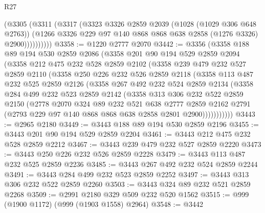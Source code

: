 \begin{lexlean}{R27}
\begin{coremodule}
              (@3305
                (@3311
                  (@3317
                    (@3323
                      @3326
                      @2859
                      @2039
                      (@1028 (@1029 @306 @648 @2763))
                      (@1266 @3326 @229 @97 @140 @868 @868 @638 @2858 (@1276 @3326) @2900))))))))))
@3358 := @1220 @2777 @2070
@3442 := @3356
    (@3358
      @188
      @89
      @194
      @530
      @2859
      @2086
      (@3358
        @201
        @90
        @194
        @529
        @2859
        @2094
        (@3358
          @212
          @475
          @232
          @528
          @2859
          @2102
          (@3358
            @239
            @479
            @232
            @527
            @2859
            @2110
            (@3358
              @250
              @226
              @232
              @526
              @2859
              @2118
              (@3358
                @113
                @487
                @232
                @525
                @2859
                @2126
                (@3358
                  @267
                  @492
                  @232
                  @524
                  @2859
                  @2134
                  (@3358
                    @284
                    @499
                    @232
                    @523
                    @2859
                    @2142
                    (@3358
                      @313
                      @306
                      @232
                      @522
                      @2859
                      @2150
                      (@2778
                        @2070
                        @324
                        @89
                        @232
                        @521
                        @638
                        @2777
                        @2859
                        @2162
                        @2791
                        (@2793 @229 @97 @140 @868 @868 @638 @2858 @2801 @2900)))))))))))
@3443 := @2965 @2180
@3449 := @3443 @188 @89 @194 @530 @2859 @2196
@3455 := @3443 @201 @90 @194 @529 @2859 @2204
@3461 := @3443 @212 @475 @232 @528 @2859 @2212
@3467 := @3443 @239 @479 @232 @527 @2859 @2220
@3473 := @3443 @250 @226 @232 @526 @2859 @2228
@3479 := @3443 @113 @487 @232 @525 @2859 @2236
@3485 := @3443 @267 @492 @232 @524 @2859 @2244
@3491 := @3443 @284 @499 @232 @523 @2859 @2252
@3497 := @3443 @313 @306 @232 @522 @2859 @2260
@3503 := @3443 @324 @89 @232 @521 @2859 @2268
@3509 := @2991 @2180 @329 @509 @232 @520 @1562
@3515 := @999 (@1900 @1172) (@999 (@1903 @1558) @2964)
@3548 := @3442

\end{coremodule}
\end{lexlean}
